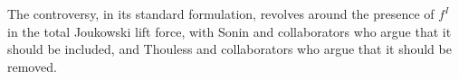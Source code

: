 \documentclass[preprints,article,accept,moreauthors,pdftex]{mdpi}
\begin{document}
The controversy, in its standard formulation, revolves around the presence of $f^I$ in the total Joukowski lift force, with Sonin and collaborators who argue that it should be included, and Thouless and collaborators who argue that it should be removed.   








\end{document}
